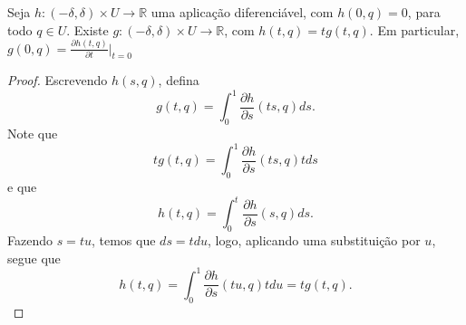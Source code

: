 \begin{lemma}
    \label{loc:5.5_lema_:_possibilidade_de_fatorar_t_de_uma_função}
    Seja $h:(-\delta, \delta)\times U\to \mathbb{R}$ uma aplicação diferenciável, com $h(0, q)=0$, para todo $q \in U$. Existe $g:(-\delta, \delta)\times U\to \mathbb{R}$, com $h(t, q)=tg(t, q)$. Em particular, $g(0, q)=\frac{\partial h(t, q)}{\partial t}|_{t=0}$
    \begin{proof}

        Escrevendo $h(s,q)$, defina
        \begin{equation*}
            g(t,q)=\int_{0}^{1}\frac{\partial h}{\partial s}(ts,q)ds.
        \end{equation*}
        Note que
        \begin{equation*}
            tg(t, q)=\int_{0}^{1}\frac{\partial h}{\partial s}(ts,q)tds
        \end{equation*}
        e que
        \begin{equation*}
            h(t, q)=\int_{0}^{t}\frac{\partial h}{\partial s}(s, q)ds.
        \end{equation*}
        Fazendo $s=tu$, temos que $ds=tdu$, logo, aplicando uma substituição por $u$, segue que
        \begin{equation*}
            h(t,q)=\int_{0}^{1}\frac{\partial h}{\partial s}(tu, q)tdu = tg(t,q).
        \end{equation*}
    \end{proof}
\end{lemma}
